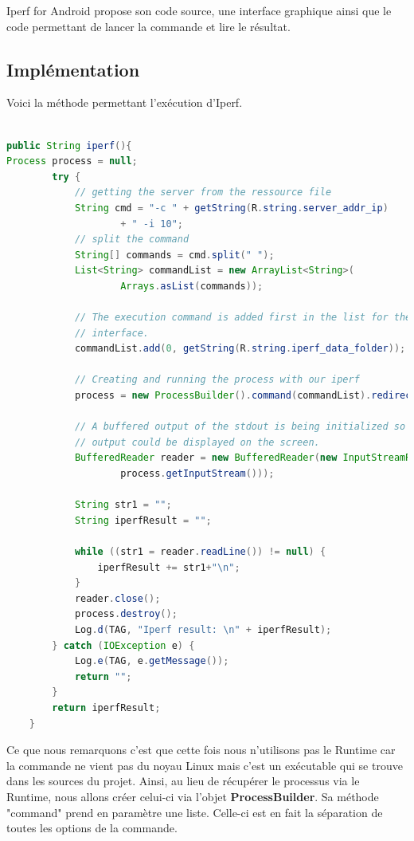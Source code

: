 \medskip

Iperf for Android propose son code source, une interface graphique ainsi que le code permettant de lancer la commande et lire le résultat.

\subsection{Implémentation}

Voici la méthode permettant l'exécution d'Iperf.

\begin{lstlisting}[language=Java, caption=Code d'exécution d'Iperf]

public String iperf(){
Process process = null;
		try {
			// getting the server from the ressource file
			String cmd = "-c " + getString(R.string.server_addr_ip)
					+ " -i 10";
			// split the command
			String[] commands = cmd.split(" ");
			List<String> commandList = new ArrayList<String>(
					Arrays.asList(commands));
					
			// The execution command is added first in the list for the shell
			// interface.
			commandList.add(0, getString(R.string.iperf_data_folder));

			// Creating and running the process with our iperf
			process = new ProcessBuilder().command(commandList).redirectErrorStream(true).start();
			
			// A buffered output of the stdout is being initialized so the iperf
			// output could be displayed on the screen.
			BufferedReader reader = new BufferedReader(new InputStreamReader(
					process.getInputStream()));
					
			String str1 = "";
			String iperfResult = "";

			while ((str1 = reader.readLine()) != null) {
				iperfResult += str1+"\n";
			}
			reader.close();
			process.destroy();
			Log.d(TAG, "Iperf result: \n" + iperfResult);
		} catch (IOException e) {
			Log.e(TAG, e.getMessage());
			return "";
		}
		return iperfResult;
	}
\end{lstlisting}

Ce que nous remarquons c'est que cette fois nous n'utilisons pas le Runtime car la commande ne vient pas du noyau Linux mais c'est un exécutable qui se trouve dans les sources du projet. Ainsi, au lieu de récupérer le processus via le Runtime, nous allons créer celui-ci via l'objet \textbf{ProcessBuilder}. Sa méthode "command" prend en paramètre une liste. Celle-ci est en fait la séparation de toutes les options de la commande.

